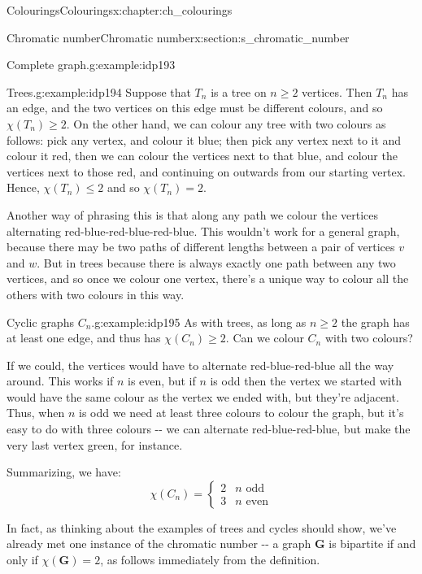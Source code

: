 \documentclass[oneside,10pt,]{book}
\numberwithin{equation}{section}
\newcommand{\bfG}{\mathbf{G}}
\begin{document}
\begin{chapterptx}{Colourings}{}{Colourings}{}{}{x:chapter:ch_colourings}
\begin{sectionptx}{Chromatic number}{}{Chromatic number}{}{}{x:section:s_chromatic_number}
\begin{example}{Complete graph.}{g:example:idp193}
\end{example}
\begin{example}{Trees.}{g:example:idp194}%
Suppose that \(T_n\) is a tree on \(n\geq 2\) vertices.  Then \(T_n\) has an edge, and the two vertices on this edge must be different colours, and so \(\chi(T_n)\geq 2\).  On the other hand, we can colour any tree with two colours as follows: pick any vertex, and colour it blue; then pick any vertex next to it and colour it red, then we can colour the vertices next to that blue, and colour the vertices next to those red, and continuing on outwards from our starting vertex.  Hence, \(\chi(T_n)\leq 2\) and so \(\chi(T_n)=2\).%
\par
Another way of phrasing this is that along any path we colour the vertices alternating red-blue-red-blue-red-blue.  This wouldn't work for a general graph, because there may be two paths of different lengths between a pair of vertices \(v\) and \(w\).  But in trees because there is always exactly one path between any two vertices, and so once we colour one vertex, there's a unique way to colour all the others with two colours in this way.%
\end{example}
\begin{example}{Cyclic graphs \(C_n\).}{g:example:idp195}%
As with trees, as long as \(n\geq 2\) the graph has at least one edge, and thus has \(\chi(C_n)\geq 2\).  Can we colour \(C_n\) with two colours?%
\par
If we could, the vertices would have to alternate red-blue-red-blue all the way around.  This works if \(n\) is even, but if \(n\) is odd then the vertex we started with would have the same colour as the vertex we ended with, but they're adjacent.  Thus, when \(n\) is odd we need at least three colours to colour the graph, but it's easy to do with three colours -{}-{} we can alternate red-blue-red-blue, but make the very last vertex green, for instance.%
\par
Summarizing, we have:%
\begin{equation*}
\chi(C_n)=\begin{cases} 2 & n \text{ odd} \\ 3 & n \text{ even} \end{cases}
\end{equation*}
%
\end{example}
In fact, as thinking about the examples of trees and cycles should show, we've already met one instance of the chromatic number -{}-{} a graph \(\bfG\) is bipartite if and only if \(\chi(\bfG)=2\), as follows immediately from the definition.%

\end{sectionptx}
\end{chapterptx}
\end{document}
